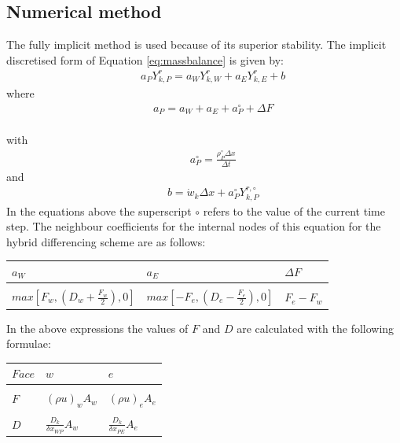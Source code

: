 \subsection{Numerical method}
The fully implicit method is used because of its superior stability. The implicit discretised form of Equation \ref{eq:massbalance} is given by:
\begin{align}
&&	a_P Y^r_{k,P} = a_W Y^r_{k,W} +  a_E Y^r_{k,E} + b
\end{align}
where 
\begin{align}
&& a_P = a_W + a_E + a_P^\circ + \Delta F 
\end{align} \\
with 
\begin{align}
&&	a_P^\circ = \frac{\rho_P^\circ \Delta x}{\Delta t}
\end{align}
and 
\begin{align}
&& b = \dot{w}_k \Delta x + a_P^\circ Y^{r, \circ}_{k,P}
\end{align} 
In the equations above the superscript $\circ$ refers to the value of the current time step.  
The neighbour coefficients for the internal nodes of this equation for the hybrid differencing scheme are as follows:
\begin{table}[H]
	\centering
	\begin{tabular}{|l|l|l|}
		\hline
		$a_W$     & $a_E$   & $\Delta F$ \\ \hline  \vspace{-0.3cm}
		& & \\
        $max\left[F_w, \left(D_w + \frac{F_w}{2}\right),0\right]$  & $max\left[-F_e, \left(D_e - \frac{F_e}{2}\right),0\right]$  & $F_e - F_w$  \\ \hline
	\end{tabular}
\end{table}
In the above expressions the values of $F$ and $D$ are calculated with the following formulae:
\begin{table}[H]
	\centering
	\begin{tabular}{|l|l|l|}
		\hline
		$Face$     & $w$   & $e$ \\ \hline  \vspace{-0.3cm}
		& & \\
		$F$  &$(\rho u)_w A_w$ & $(\rho u)_e A_e$ \\ \hline \vspace{-0.3cm}
		& & \\
		$D$  &$\frac{D_k}{\delta x_{WP}}A_w$ & $\frac{D_k}{\delta x_{PE}}A_e$ \\ \hline		
	\end{tabular}
\end{table}
